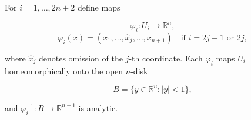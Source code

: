 For $i = 1, \ldots, 2n+2$ define maps

$$\varphi_i : U_i \to \mathbb{R}^n,$$
$$\varphi_i(x) = (x_1, \ldots, \hat{x}_j, \ldots, x_{n+1}) \quad \text{if } i = 2j-1 \text{ or } 2j,$$

where $\hat{x}_j$ denotes omission of the $j$-th coordinate. Each $\varphi_i$ maps $U_i$ homeomorphically onto the open $n$-disk

$$B = \{y \in \mathbb{R}^n : |y| < 1\},$$

and $\varphi_i^{-1}: B \to \mathbb{R}^{n+1}$ is analytic.
